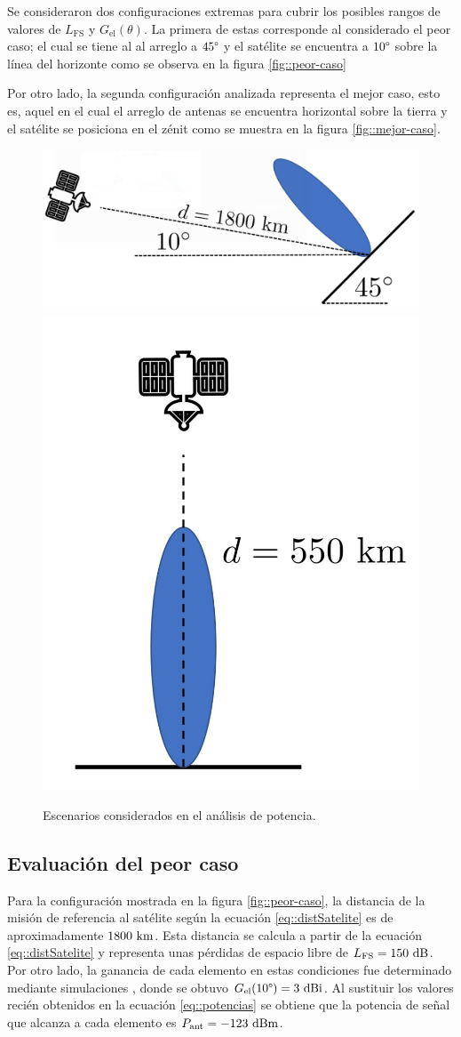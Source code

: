 \documentclass[../../main.tex]{subfiles}
\begin{document}
Se consideraron dos configuraciones extremas para cubrir los posibles rangos de valores de $L_\textrm{FS}$ y $G_\textrm{el}(\theta)$. 
La primera de estas corresponde al considerado el peor caso; el cual se tiene al al arreglo a $45\degree$ y el satélite se encuentra a $10\degree$ sobre la línea del horizonte como se observa en la figura \ref{fig::peor-caso}

Por otro lado, la segunda configuración analizada representa el mejor caso, esto es, aquel en el cual el arreglo de antenas se encuentra horizontal sobre la tierra y el satélite se posiciona en el zénit como se muestra en la figura \ref{fig::mejor-caso}.

\begin{figure}[H]
    \centering
    {\includegraphics[width=0.7\linewidth]{peor-caso.png}}\\[1PC]
    {\includegraphics[width=0.45\linewidth]{mejor-caso.jpg}}
    \caption{Escenarios considerados en el análisis de potencia.}
    \label{fig::casos-potencia}
\end{figure}

\subsection{Evaluación del peor caso}
Para la configuración mostrada en la figura \ref{fig::peor-caso}, la distancia de la misión de referencia al satélite según la ecuación \ref{eq::distSatelite} es de aproximadamente $1800~\textrm{km}$. Esta distancia se calcula a partir de la ecuación \ref{eq::distSatelite} y representa unas pérdidas de espacio libre de $L_\textrm{FS} = 150~\textrm{dB}$. 
Por otro lado, la ganancia de cada elemento en estas condiciones fue determinado mediante simulaciones , donde se obtuvo $G_\textrm{el}(10\degree) = 3~\textrm{dBi}$. Al sustituir los valores recién obtenidos en la ecuación \ref{eq::potencias} se obtiene que la potencia de señal que alcanza a cada elemento es $P_\textrm{ant} = -123~\textrm{dBm}$.
\end{document}
